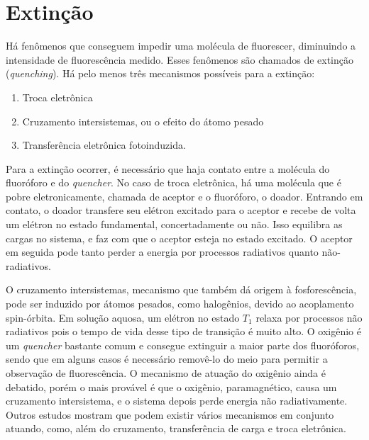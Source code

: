 		
		\section{Extinção}
		
		Há fenômenos que conseguem impedir uma molécula de fluorescer, diminuindo a intensidade de fluorescência medido. Esses fenômenos são chamados de extinção (\emph{quenching}). Há pelo menos três mecanismos possíveis para a extinção:
		
		\begin{enumerate}[noitemsep]
			\item Troca eletrônica
			\item Cruzamento intersistemas, ou o efeito do átomo pesado
			\item Transferência eletrônica fotoinduzida.
		\end{enumerate}
		
		Para a extinção ocorrer, é necessário que haja contato entre a molécula do fluoróforo e do \emph{quencher}. No caso de troca eletrônica, há uma molécula que é pobre eletronicamente, chamada de aceptor e o fluoróforo, o doador. Entrando em contato, o doador transfere seu elétron excitado para o aceptor e recebe de volta um elétron no estado fundamental, concertadamente ou não. Isso equilibra as cargas no sistema, e faz com que o aceptor esteja no estado excitado. O aceptor em seguida pode tanto perder a energia por processos radiativos quanto não-radiativos. %
		
		O cruzamento intersistemas, mecanismo que também dá origem à fosforescência, pode ser induzido por átomos pesados, como halogênios, devido ao acoplamento spin-órbita. Em solução aquosa, um elétron no estado \(T_1\) relaxa por processos não radiativos pois o tempo de vida desse tipo de transição é muito alto. O oxigênio é um \emph{quencher} bastante comum e consegue extinguir a maior parte dos fluoróforos, sendo que em alguns casos é necessário removê-lo do meio para permitir a observação de fluorescência. O mecanismo de atuação do oxigênio ainda é debatido, porém o mais provável é que o oxigênio, paramagnético, causa um cruzamento intersistema, e o sistema depois perde energia não radiativamente. Outros estudos mostram que podem existir vários mecanismos em conjunto atuando, como, além do cruzamento, transferência de carga e troca eletrônica. %
		
